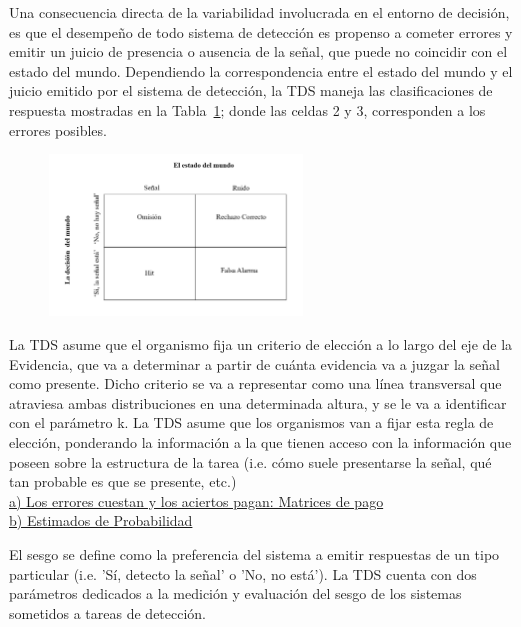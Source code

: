  Una consecuencia directa de la variabilidad involucrada en el entorno de decisión, es que el desempeño de todo sistema de detección es propenso a cometer errores y emitir un juicio de presencia o ausencia de la señal, que puede no coincidir con el estado del mundo. Dependiendo la correspondencia entre el estado del mundo y el juicio emitido por el sistema de detección, la TDS maneja las clasificaciones de respuesta mostradas en la Tabla~\ref{fig:Mat_Output}; donde las celdas 2 y 3, corresponden a los errores posibles.\\

\begin{figure}[th]
\centering
\includegraphics[width=0.60\textwidth]{Figures/Matriz_Outputs} 
\caption[Posibles Resultados en una Tarea de Detección]{}
\label{fig:Mat_Output}
\end{figure}

La TDS asume que el organismo fija un criterio de elección a lo largo del eje de la Evidencia, que va a determinar a partir de cuánta evidencia va a juzgar la señal como presente. Dicho criterio se va a representar como una línea transversal que atraviesa ambas distribuciones en una determinada altura, y se le va a identificar con el parámetro k. La TDS asume que los organismos van a fijar esta regla de elección, ponderando la información a la que tienen acceso con la información que poseen sobre la estructura de la tarea (i.e. cómo suele presentarse la señal, qué tan probable es que se presente, etc.)\\


      \underline{a) Los errores cuestan y los aciertos pagan: Matrices de pago}\\

      \underline{b) Estimados de Probabilidad}

El sesgo se define como la preferencia del sistema a emitir respuestas de un tipo particular (i.e. 'Sí, detecto la señal' o 'No, no está'). La TDS cuenta con dos parámetros dedicados a la medición y evaluación del sesgo de los sistemas sometidos a tareas de detección.

